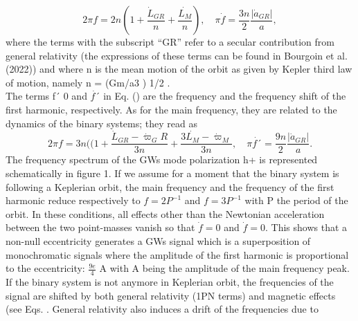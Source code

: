 \documentclass[a4paper,10.5pt]{article}
\begin{document}
\begin{equation}\tag{2.4}
    2\pi f = 2n (1+ \frac{\dot{L}_{GR}}{n}+ \frac{\dot{L_M}}{n}), \quad 
    \pi\dot{f}= \frac{3n}{2} \frac{|\dot{a}_{GR}|}{a},
\end{equation}
where the terms with the subscript “GR” refer to a secular contribution from general relativity (the expressions of these terms can be found in Bourgoin et al. (2022)) and where n is the mean motion of the orbit as given by Kepler third law of motion, namely n = (Gm/a3 ) 1/2 .\\
The terms f´ 0 and $\dot{f ´}$ in Eq. () are the frequency and the frequency shift of the first harmonic, respectively. As for the main frequency, they are related to the dynamics of the binary systems; they read as
\begin{equation} \tag{2.5}
     2\pi f = 3n( (1+ \frac{\dot{L}_{GR} - \dot{\varpi}_GR}{3n}+ \frac{3\dot{L_M}-\dot{\varpi}_M }{3n}, \quad 
    \pi\dot{f´}= \frac{9n}{2} \frac{|\dot{a}_{GR}|}{a}.
\end{equation}
The frequency spectrum of the GWs mode polarization h+  is represented schematically in figure 1. If we assume for a moment that the binary system is following a Keplerian orbit, the main frequency and the frequency of the first harmonic reduce respectively to $f = 2P^{−1} $  and $f = 3P^{−1}$ with P the period of the orbit. In these conditions, all effects other than the Newtonian acceleration between the two point-masses vanish so that $\dot{f} = 0$ and $\dot{f} = 0.$ This shows that a non-null eccentricity generates a GWs signal which is a superposition of monochromatic signals where the amplitude of the first harmonic is proportional to the eccentricity: $\frac{9e}{ 4}$ A with A being the amplitude of the main frequency peak. If the binary system is not anymore in Keplerian orbit, the frequencies of the signal are shifted by both general relativity (1PN terms) and magnetic effects (see Eqs. . General relativity  also induces a drift of the frequencies due to
\end{document}
